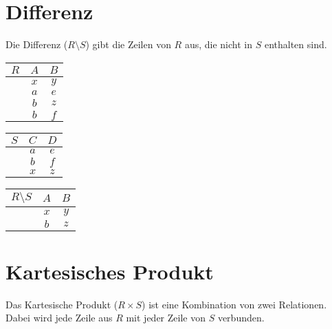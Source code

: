 \documentclass[12pt,a4paper,notitlepage,leqno]{article}
\begin{document}
\section*{Differenz}

Die Differenz ($R\setminus S$) gibt die Zeilen von $R$ aus, die nicht in $S$ enthalten sind.

\begin{center}
    \begin{tabular}{c|cc}
        $R$ & $A$ & $B$\\\hline
         & $x$ & $y$\\
         & $a$ & $e$\\
         & $b$ & $z$\\
         & $b$ & $f$
    \end{tabular}
    \hspace{1cm}
    \begin{tabular}{c|cc}
        $S$ & $C$ & $D$ \\\hline
         & $a$ & $e$\\
         & $b$ & $f$\\
         & $x$ & $z$
    \end{tabular}
    \hspace{1cm}
    \begin{tabular}{c|cc}
        $R\setminus S$ & $A$ & $B$ \\\hline
         & $x$ & $y$\\
         & $b$ & $z$
    \end{tabular}
\end{center}

\section*{Kartesisches Produkt}

Das Kartesische Produkt ($R\times S$) ist eine Kombination von zwei Relationen. Dabei wird jede Zeile aus $R$ mit jeder Zeile von $S$ verbunden.
\end{document}

